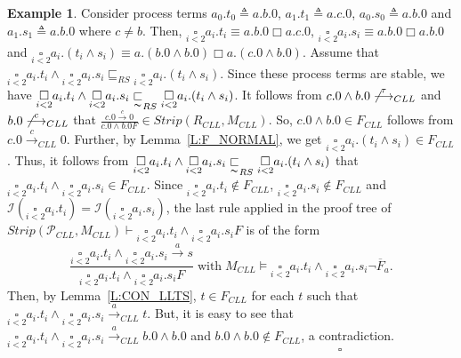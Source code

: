 \documentclass{elsarticle}
\theoremstyle{plain}
\theoremstyle{definition}
\newtheorem{example}[theorem]{Example}
\begin{document}
\begin{example}
Consider process terms
$a_0.t_0 \triangleq a.b.0$, $a_1.t_1 \triangleq a.c.0$, $a_0.s_0 \triangleq a.b.0$ and $a_1.s_1 \triangleq a.b.0$ where $c \neq b$.
Then, $\underset{i<2}\square a_i.t_i \equiv a.b.0 \Box a.c.0$,
$\underset{i<2}\square a_i.s_i \equiv a.b.0 \Box a.b.0$
and $\underset{i<2}\square a_i.(t_i \wedge s_i) \equiv a.(b.0 \wedge b.0) \Box a.(c.0 \wedge b.0)$.
Assume that $\underset{i<2}\square a_i.t_i \wedge \underset{i<2}\square a_i.s_i \sqsubseteq_{RS} \underset{i<2}\square a_i.(t_i \wedge s_i) $.
Since these process terms are stable, we have $\underset{i<2}\square a_i.t_i \wedge \underset{i<2}\square a_i.s_i \underset{\thicksim}{\sqsubset}_{RS} \underset{i<2}\square a_i.(t_i \wedge s_i) $.
It follows from $c.0 \wedge b.0 \not\stackrel{\tau}{\longrightarrow}_{CLL}$ and $b.0 \not\stackrel{c}{\longrightarrow}_{CLL}$ that $\frac{c.0 \stackrel{c}{\longrightarrow}0}{c.0 \wedge b.0F} \in Strip(R_{CLL},M_{CLL})$.
So, $c.0 \wedge b.0 \in F_{CLL}$ follows from $c.0 \stackrel{c}{\longrightarrow}_{CLL}0$.
Further, by Lemma~\ref{L:F_NORMAL}, we get $\underset{i<2}\square a_i.(t_i \wedge s_i)  \in F_{CLL}$.
Thus, it follows from $\underset{i<2}\square a_i.t_i \wedge \underset{i<2}\square a_i.s_i \underset{\thicksim}{\sqsubset}_{RS} \underset{i<2}\square a_i.(t_i \wedge s_i) $ that $\underset{i<2}\square a_i.t_i \wedge \underset{i<2}\square a_i.s_i \in F_{CLL}$.
Since $\underset{i<2}\square a_i.t_i \notin F_{CLL}$, $ \underset{i<2}\square a_i.s_i \notin F_{CLL}$ and ${\mathcal I}(\underset{i<2}\square a_i.t_i) = {\mathcal I}(\underset{i<2}\square a_i.s_i)$, the last rule applied in the proof tree of $Strip({\mathcal P}_{CLL},M_{CLL})\vdash \underset{i<2}\square a_i.t_i \wedge \underset{i<2}\square a_i.s_iF$ is of the form \[\frac{\underset{i<2}\square a_i.t_i \wedge \underset{i<2}\square a_i.s_i \stackrel{a}{\longrightarrow}s}{\underset{i<2}\square a_i.t_i \wedge \underset{i<2}\square a_i.s_iF}\;\text{with}\; M_{CLL}\models \underset{i<2}\square a_i.t_i \wedge \underset{i<2}\square a_i.s_i \neg \overline{F}_{a}.\]
Then, by Lemma~\ref{L:CON_LLTS}, $t \in F_{CLL}$ for each $t$ such that $\underset{i<2}\square a_i.t_i \wedge \underset{i<2}\square a_i.s_i \stackrel{a}{\longrightarrow}_{CLL}t$.
But, it is easy to see that $\underset{i<2}\square a_i.t_i \wedge \underset{i<2}\square a_i.s_i \stackrel{a}{\longrightarrow}_{CLL}b.0 \wedge b.0$ and $b.0 \wedge b.0 \notin F_{CLL}$, a contradiction.
$\qquad\qquad\qquad\qquad\qquad\qquad\qquad\qquad\qquad\qquad\qquad\qquad\qquad\;\;\square$
\end{example}
\end{document}

